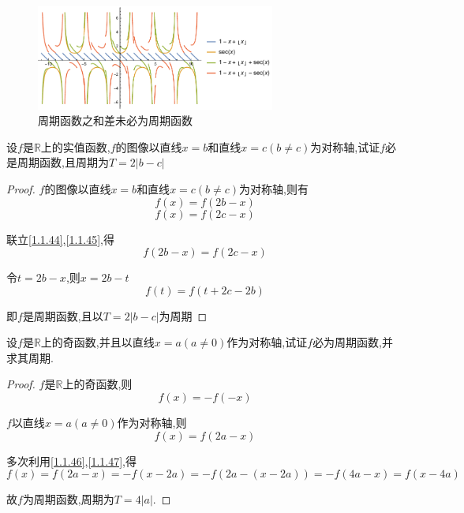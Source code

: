 \begin{figure}[H]
    \centering
    \includegraphics[width=0.7\textwidth]{../image/1-x+[x]}
    \caption{周期函数之和差未必为周期函数}
\end{figure}

\begin{exercise}[$\ $(双镜效应)]
    设$f$是$\mathbb{R}$上的实值函数,$f$的图像以直线$x=b$和直线$x=c(b\ne c)$为对称轴,试证$f$必是周期函数,且周期为$T=2|b-c|$
\end{exercise}

\begin{proof}
    
    $f$的图像以直线$x=b$和直线$x=c(b\ne c)$为对称轴,则有
    \begin{equation}
        f(x)=f(2b-x) \label{1.1.44}
    \end{equation}
    \begin{equation}
        f(x)=f(2c-x)    \label{1.1.45}
    \end{equation}
    
    联立\cref{1.1.44},\cref{1.1.45},得
    \begin{equation*}
        f(2b-x)=f(2c-x)
    \end{equation*}

    令$t=2b-x$,则$x=2b-t$
    \begin{equation*}
        f(t)=f(t+2c-2b)
    \end{equation*}

    即$f$是周期函数,且以$T=2|b-c|$为周期
\end{proof}

\begin{exercise}
    设$f$是$\mathbb{R}$上的奇函数,并且以直线$x=a(a\ne 0)$作为对称轴,试证$f$必为周期函数,并求其周期. 
\end{exercise}

\begin{proof}

    $f$是$\mathbb{R}$上的奇函数,则
    \begin{equation}
        f(x)=-f(-x) \label{1.1.46}
    \end{equation}

    $f$以直线$x=a(a\ne 0)$作为对称轴,则
    \begin{equation}
        f(x)=f(2a-x)    \label{1.1.47}
    \end{equation}

    多次利用\cref{1.1.46},\cref{1.1.47},得
    \begin{equation*}
        f(x)=f(2a-x)=-f(x-2a)=-f(2a-(x-2a))=-f(4a-x)=f(x-4a)
    \end{equation*}
    
    故$f$为周期函数,周期为$T=4|a|$. 
\end{proof}

